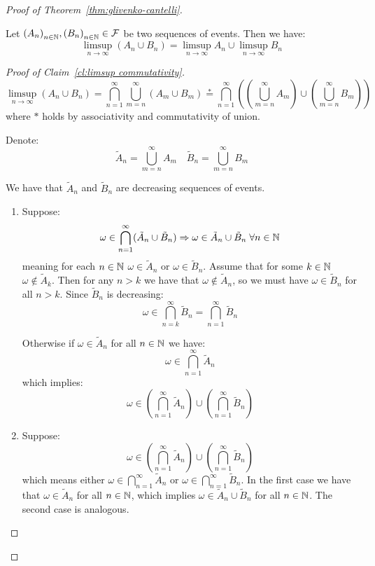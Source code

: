\begin{proof}[Proof of Theorem~\ref{thm:glivenko-cantelli}]
    \begin{claim} \label{cl:limsup commutativity}
        Let ${(A_n)}_{n \in \mathbb{N}}, {(B_n)}_{n \in \mathbb{N}} \in \mathcal{F}$ be two sequences of events. Then we have:
        \[\limsup_{n \to \infty} (A_n \cup B_n)
            = \limsup_{n \to \infty} A_n \cup \limsup_{n \to \infty} B_n\]
    \end{claim}
    \begin{proof}[Proof of Claim~\ref{cl:limsup commutativity}]
        \[\limsup_{n \to \infty} (A_n \cup B_n)
            = \bigcap_{n=1}^{\infty} \bigcup_{m=n}^{\infty} (A_m \cup B_m)
            \overset{*}{=} \bigcap_{n=1}^{\infty} \left(\left(\bigcup_{m=n}^{\infty} A_m\right) \cup \left(\bigcup_{m=n}^{\infty} B_m\right) \right)\]
        where $*$ holds by associativity and commutativity of union.
        
        Denote:
        \[\tilde{A}_n = \bigcup_{m=n}^{\infty} A_m \quad \tilde{B}_n = \bigcup_{m=n}^{\infty} B_m\]
        
        We have that $\tilde{A}_n$ and $\tilde{B}_n$ are decreasing sequences of events.
        
        \begin{enumerate}[align=left]
            \item[``$\subset$''] Suppose:
                  \[\omega \in \bigcap_{n=1}^{\infty} (\tilde{A}_n \cup \tilde{B}_n)
                      \Rightarrow \omega \in \tilde{A}_n \cup \tilde{B}_n \; \forall n \in \mathbb{N}\]
                  meaning for each $n \in \mathbb{N}$ $\omega \in \tilde{A}_n$ or $\omega \in \tilde{B}_n$. Assume that for some $k \in \mathbb{N}$ $\omega \notin \tilde{A}_k$. Then for any $n > k$ we have that $\omega \notin \tilde{A}_n$, so we must have $\omega \in \tilde{B}_n$ for all $n > k$. Since $\tilde{B}_n$ is decreasing:
                  \[\omega \in \bigcap_{n = k}^{\infty} \tilde{B}_n = \bigcap_{n = 1}^{\infty} \tilde{B}_n\]
                  
                  Otherwise if $\omega \in \tilde{A}_n$ for all $n \in \mathbb{N}$ we have:
                  \[\omega \in \bigcap_{n = 1}^{\infty} \tilde{A}_n\]
                  which implies:
                  \[\omega \in \left(\bigcap_{n = 1}^{\infty} \tilde{A}_n \right) \cup \left(\bigcap_{n = 1}^{\infty} \tilde{B}_n \right)\]
            \item[``$\supset$''] Suppose:
                  \[\omega \in \left(\bigcap_{n = 1}^{\infty} \tilde{A}_n \right) \cup \left(\bigcap_{n = 1}^{\infty} \tilde{B}_n \right)\]
                  which means either $\omega \in \bigcap_{n = 1}^{\infty} \tilde{A}_n$ or $\omega \in \bigcap_{n = 1}^{\infty} \tilde{B}_n$. In the first case we have that $\omega \in \tilde{A}_n$ for all $n \in \mathbb{N}$, which implies $\omega \in \tilde{A}_n \cup \tilde{B}_n$ for all $n \in \mathbb{N}$. The second case is analogous.
        \end{enumerate}
    \end{proof}
    

\end{proof}
